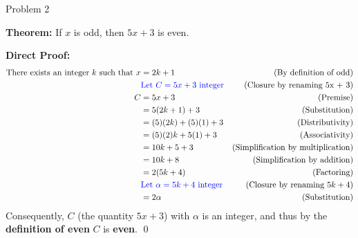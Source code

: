 \begin{problem}{Problem 2}
    \begin{highlight}
        \textbf{Theorem:} If $x$ is odd, then $5x + 3$ is even. \vspace*{1em}

        \textbf{Direct Proof:} \newline
        \begin{align*}
            \text{There exists an integer $k$ such that } x & = 2k + 1 & \text{(By definition of odd)} \\
            & \textcolor{blue}{\text{Let } C = 5x + 3 \text{ integer}} & \text{(Closure by renaming 5x + 3)} \\
            C & = 5x + 3 & \text{(Premise)} \\
            & = 5(2k + 1) + 3 & \text{(Substitution)} \\
            & = (5)(2k) + (5)(1) + 3 & \text{(Distributivity)} \\
            & = (5)(2)k + 5(1) + 3 & \text{(Associativity)} \\
            & = 10k + 5 + 3 & \text{(Simplification by multiplication)} \\
            & = 10k + 8 & \text{(Simplification by addition)} \\
            & = 2(5k + 4) & \text{(Factoring)} \\
            & \textcolor{blue}{\text{Let } \alpha = 5k + 4 \text{ integer}} & \text{(Closure by renaming $5k + 4$)} \\
            & = 2\alpha & \text{(Substitution)} \\
        \end{align*}
        Consequently, $C$ (the quantity $5x + 3$) with $\alpha$ is an integer, and thus by the \textbf{definition of even} $C$ is \textbf{even}. \qed
    \end{highlight}
\end{problem}

